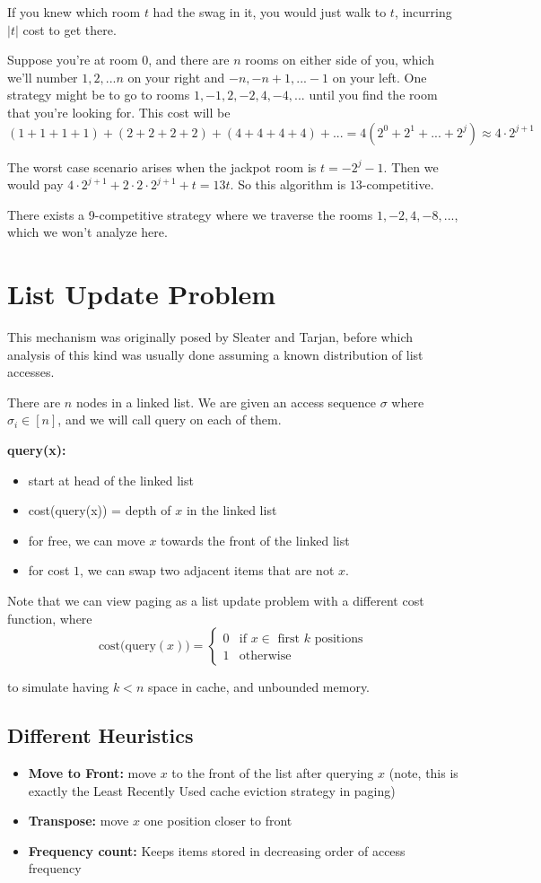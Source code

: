 \documentclass[11pt]{article}
\begin{document}
If you knew which room $t$ had the swag in it, you would just walk to $t$, incurring $|t|$ cost to get there.

Suppose you're at room 0, and there are $n$ rooms on either side of you, which we'll number $1,2,...n$ on your right and $-n , -n+1, ... -1$ on your left. One strategy might be to go to rooms $1, -1, 2, -2, 4, -4, ...$ until you find the room that you're looking for. This cost will be 
\[(1+1+1+1) + (2+2+2+2) + (4+4+4+4) + ... = 4(2^0+2^1+...+2^j) \approx 4\cdot 2^{j+1}\]

The worst case scenario arises when the jackpot room is $t=-2^j-1$. Then we would pay $4\cdot 2^{j+1}+2\cdot 2\cdot 2^{j+1} + t = 13t$. So this algorithm is $13$-competitive. 

There exists a 9-competitive strategy where we traverse the rooms $1, -2, 4, -8, ...$, which we won't analyze here. 

\section{List Update Problem}
This mechanism was originally posed by Sleater and Tarjan\cite{SJ85}, before which analysis of this kind was usually done assuming a known distribution of list accesses. 

There are $n$ nodes in a linked list. We are given an access sequence $\sigma$ where $\sigma_i\in [n]$, and we will call query on each of them.

\textbf{query(x):}
\begin{itemize}
    \item start at head of the linked list
    \item cost(query(x)) = depth of $x$ in the linked list
    \item for free, we can move $x$ towards the front of the linked list
    \item for cost $1$, we can swap two adjacent items that are not $x$. 
\end{itemize}

Note that we can view paging as a list update problem with a different cost function, where \[\text{cost(query}(x)) = \begin{cases}0 &\text{if } x\in \text{ first $k$ positions} \\ 1 & \text{otherwise}\end{cases}\]

to simulate having $k<n$ space in cache, and unbounded memory.

\subsection{Different Heuristics}
\begin{itemize}
    \item \textbf{Move to Front:} move $x$ to the front of the list after querying $x$ (note, this is exactly the Least Recently Used cache eviction strategy in paging)
    \item \textbf{Transpose:} move $x$ one position closer to front
    \item \textbf{Frequency count:} Keeps items stored in decreasing order of access frequency
\end{itemize}
\end{document}
